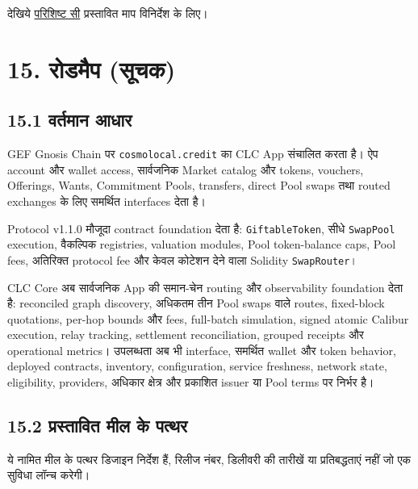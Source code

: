 \documentclass[11pt]{article}
\begin{document}
देखिये \href{https://docs.cosmolocal.credit/hi/white-paper/appendix-c-kpi-definitions}{परिशिष्ट सी} प्रस्तावित माप विनिर्देश के लिए।


\section*{15. रोडमैप (सूचक)}

\subsection*{15.1 वर्तमान आधार}

GEF Gnosis Chain पर \texttt{cosmolocal.credit} का CLC App संचालित करता है। ऐप account और wallet access, सार्वजनिक Market catalog और tokens, vouchers, Offerings, Wants, Commitment Pools, transfers, direct Pool swaps तथा routed exchanges के लिए समर्थित interfaces देता है।

Protocol v1.1.0 मौजूदा contract foundation देता है: \texttt{GiftableToken}, सीधे \texttt{SwapPool} execution, वैकल्पिक registries, valuation modules, Pool token-balance caps, Pool fees, अतिरिक्त protocol fee और केवल कोटेशन देने वाला Solidity \texttt{SwapRouter}।

CLC Core अब सार्वजनिक App की समान-चेन routing और observability foundation देता है: reconciled graph discovery, अधिकतम तीन Pool swaps वाले routes, fixed-block quotations, per-hop bounds और fees, full-batch simulation, signed atomic Calibur execution, relay tracking, settlement reconciliation, grouped receipts और operational metrics। उपलब्धता अब भी interface, समर्थित wallet और token behavior, deployed contracts, inventory, configuration, service freshness, network state, eligibility, providers, अधिकार क्षेत्र और प्रकाशित issuer या Pool terms पर निर्भर है।

\subsection*{15.2 प्रस्तावित मील के पत्थर}

ये नामित मील के पत्थर डिजाइन निर्देश हैं, रिलीज नंबर, डिलीवरी की तारीखें या प्रतिबद्धताएं नहीं जो एक सुविधा लॉन्च करेगी।
\end{document}
